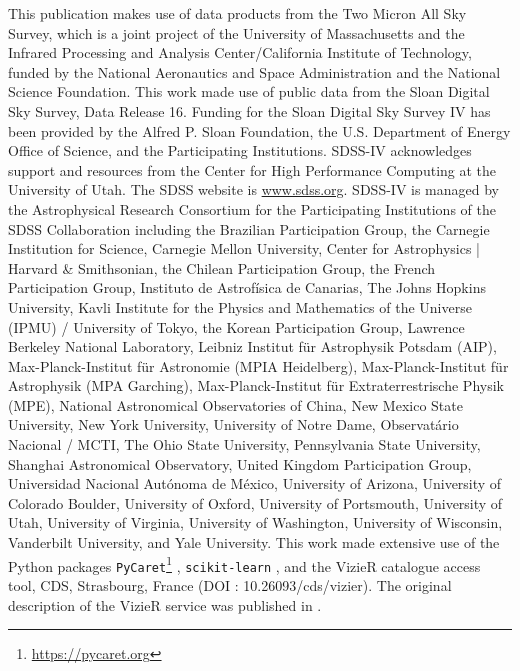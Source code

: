 \documentclass{aa}
\begin{document}
\begin{acknowledgements}
This publication makes use of data products from the Two Micron All Sky Survey, which is a joint project of the University of Massachusetts and the Infrared Processing and Analysis Center/California Institute of Technology, funded by the National Aeronautics and Space Administration and the National Science Foundation.
This work made use of public data from the Sloan Digital Sky Survey, Data Release 16. Funding for the Sloan Digital Sky Survey IV has been provided by the Alfred P. Sloan Foundation, the U.S. Department of Energy Office of Science, and the Participating Institutions. 
SDSS-IV acknowledges support and resources from the Center for High Performance Computing  at the University of Utah. The SDSS website is \url{www.sdss.org}.
SDSS-IV is managed by the Astrophysical Research Consortium for the Participating Institutions of the SDSS Collaboration including the Brazilian Participation Group, the Carnegie Institution for Science, Carnegie Mellon University, Center for Astrophysics | Harvard \& Smithsonian, the Chilean Participation Group, the French Participation Group, Instituto de Astrof\'isica de Canarias, The Johns Hopkins University, Kavli Institute for the Physics and Mathematics of the Universe (IPMU) / University of Tokyo, the Korean Participation Group, Lawrence Berkeley National Laboratory, Leibniz Institut f\"ur Astrophysik Potsdam (AIP),  Max-Planck-Institut f\"ur Astronomie (MPIA Heidelberg), Max-Planck-Institut f\"ur Astrophysik (MPA Garching), Max-Planck-Institut f\"ur Extraterrestrische Physik (MPE), National Astronomical Observatories of China, New Mexico State University, New York University, University of Notre Dame, Observat\'ario Nacional / MCTI, The Ohio State University, Pennsylvania State University, Shanghai Astronomical Observatory, United Kingdom Participation Group, Universidad Nacional Aut\'onoma de M\'exico, University of Arizona, University of Colorado Boulder, University of Oxford, University of Portsmouth, University of Utah, University of Virginia, University of Washington, University of Wisconsin, Vanderbilt University, and Yale University.
This work made extensive use of the Python packages \verb|PyCaret|\footnote{\url{https://pycaret.org}} \citep[\texttt{v2.3.10};][]{PyCaret}, \verb|scikit-learn| \citep[\texttt{v0.23.2};][]{scikit-learn}, and the VizieR catalogue access tool, CDS, Strasbourg, France (DOI : 10.26093/cds/vizier). The original description of the VizieR service was published in \cite{vizier}.

\end{acknowledgements}
\end{document}
